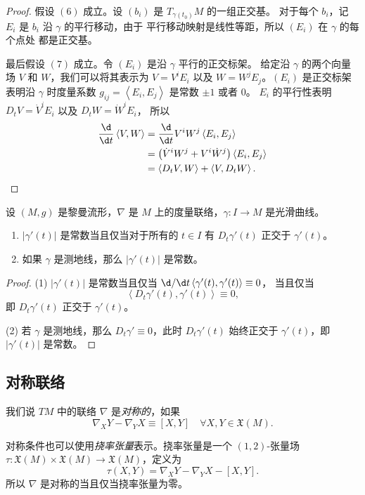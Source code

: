 \documentclass[fontset=none]{Notes}
\newcommand{\inn}[1]{\left\langle #1\right\rangle}
\begin{document}
\begin{proof}
  假设 $(6)$ 成立。设 $(b_i)$ 是 $T_{\gamma(t_0)}M$ 的一组正交基。
  对于每个 $b_i$，记 $E_i$ 是 $b_i$ 沿 $\gamma$ 的平行移动，由于
  平行移动映射是线性等距，所以 $(E_i)$ 在 $\gamma$ 的每个点处
  都是正交基。

  最后假设 $(7)$ 成立。令 $(E_i)$ 是沿 $\gamma$ 平行的正交标架。
  给定沿 $\gamma$ 的两个向量场 $V$ 和 $W$，我们可以将其表示为
  $V=V^iE_i$ 以及 $W=W^jE_j$。$(E_i)$ 是正交标架表明沿 $\gamma$
  时度量系数 $g_{ij}=\inn{E_i,E_j}$ 是常数 $\pm 1$ 或者 $0$。
  $E_i$ 的平行性表明 $D_tV=\dot V^iE_i$ 以及 $D_tW=\dot W^iE_i$，
  所以 
  \begin{align*}
    \frac{\d}{\d t}\inn{V,W}&=\frac{\d}{\d t}V^iW^j\inn{E_i,E_j}\\
    &=\bigl(\dot V^iW^j+V^i\dot W^j\bigr)\inn{E_i,E_j}\\
    &=\inn{D_tV,W}+\inn{V,D_tW}.\qedhere
  \end{align*}
\end{proof}
 
\begin{corollary}
  设 $(M,g)$ 是黎曼流形，$\nabla$ 是 $M$ 上的度量联络，$\gamma:I\to M$
  是光滑曲线。
  \begin{enumerate}
    \item $|\gamma'(t)|$ 是常数当且仅当对于所有的 $t\in I$ 有 $D_t\gamma'(t)$ 正交于 $\gamma'(t)$。
    \item 如果 $\gamma$ 是测地线，那么 $|\gamma'(t)|$ 是常数。
  \end{enumerate}
\end{corollary}
\begin{proof}
  (1) $|\gamma'(t)|$ 是常数当且仅当 $\d/\d t\inn{\gamma'(t),\gamma'(t)}\equiv 0$，
  当且仅当
  \[
    \inn{D_t\gamma'(t),\gamma'(t)} \equiv 0,
  \]
  即 $D_t\gamma'(t)$ 正交于 $\gamma'(t)$。

  (2) 若 $\gamma$ 是测地线，那么 $D_t\gamma'\equiv 0$，此时 $D_t\gamma'(t)$
  始终正交于 $\gamma'(t)$，即 $|\gamma'(t)|$ 是常数。
\end{proof}

\subsection{对称联络}

我们说 $TM$ 中的联络 $\nabla$ 是\emph{对称的}，如果
\[
  \nabla_XY-\nabla_YX\equiv [X,Y]\quad \forall X,Y\in \mathfrak{X}(M).  
\]

对称条件也可以使用\emph{挠率张量}表示。挠率张量是一个 $(1,2)$-张量场
$\tau:\mathfrak{X}(M)\times \mathfrak{X}(M)\to \mathfrak{X}(M)$，定义为
\[
  \tau(X,Y)=\nabla_XY-\nabla_YX-[X,Y].  
\]
所以 $\nabla$ 是对称的当且仅当挠率张量为零。
\end{document}
